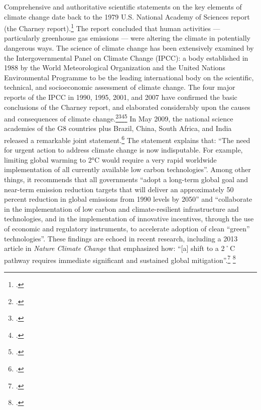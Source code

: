 \documentclass[10pt]{article}
\begin{document}
Comprehensive and authoritative scientific statements on the key elements of climate change date back to the 1979 U.S. National Academy of Sciences report (the Charney report).\footcite[][]{Charney1979}
The report concluded that human activities --- particularly greenhouse gas emissions --- were altering the climate in potentially dangerous ways.
The science of climate change has been extensively examined by the Intergovernmental Panel on Climate Change (IPCC): a body established in 1988 by the World Meteorological Organization and the United Nations Environmental Programme to be the leading international body on the scientific, technical, and socio­economic assessment of climate change.
The four major reports of the IPCC in 1990, 1995, 2001, and 2007 have confirmed the basic conclusions of the Charney report, and elaborated considerably upon the causes and consequences of climate change.\footcite[][]{IPCC1990}\footcite[][]{IPCC1995}\footcite[][]{IPCC2001}\footcite[][]{IPCC2007}
In May 2009, the national science academies of the G8 countries plus Brazil, China, South Africa, and India released a remarkable joint statement.\footcite[][]{G8plusJointStatement}
The statement explains that: ``The need for urgent action to address climate change is now indisputable. For example, limiting global warming to 2°C would require a very rapid worldwide implementation of all currently available low carbon technologies''.
Among other things, it recommends that all governments ``adopt a long-term global goal and near-term emission reduction targets that will deliver an approximately 50 percent reduction in global emissions from 1990 levels by 2050'' and ``collaborate in the implementation of low carbon and climate-resilient infrastructure and technologies, and in the implementation of innovative incentives, through the use of economic and regulatory instruments, to accelerate adoption of clean “green” technologies''.
These findings are echoed in recent research, including a 2013 article in \emph{Nature Climate Change} that emphasized how: ``[a] shift to a 2˚C pathway requires immediate significant and sustained global mitigation''.\footcite[][p. 1]{ChallengeTwoDegrees} \footcite[See also: ][]{EmissionTargetsTwoDegrees}
\end{document}

